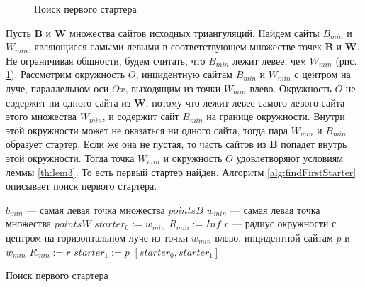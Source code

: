 \documentclass[12pt]{article}
\begin{document}
\begin{figure}[htb!]
	\caption{Поиск первого стартера}
	\label{pic:starterExample}
\end{figure}

Пусть $\textbf{B}$ и $\textbf{W}$ множества сайтов исходных триангуляций.
Найдем сайты $B_{min}$ и $W_{min}$, являющиеся самыми левыми в соответствующем множестве точек $\textbf{B}$ и $\textbf{W}$.
Не ограничивая общности, будем считать, что $B_{min}$ лежит левее, чем $W_{min}$  (рис. \ref{pic:starterExample}).
Рассмотрим окружность $O$, инцидентную сайтам $B_{min}$ и $W_{min}$ с центром на луче, параллельном оси $Ox$,
выходящим из точки $W_{min}$ влево.
Окружность $O$ не содержит ни одного сайта из $\textbf{W}$, потому что лежит левее самого левого сайта этого множества $W_{min}$,
и содержит сайт $B_{min}$ на границе окружности.
Внутри этой окружности может не оказаться ни одного сайта, тогда пара $W_{min}$ и $B_{min}$ образует стартер.
Если же она не пустая, то часть сайтов из $\textbf{B}$ попадет внутрь этой окружности.
Тогда точка $W_{min}$ и окружность $O$ удовлетворяют условиям леммы \ref{th:lem3}.
То есть первый стартер найден.
Алгоритм \ref{alg:findFirstStarter} описывает поиск первого стартера.

\begin{algorithm}[htb!]
\begin{algorithmic}[1]
	\State $b_{min}$ --- самая левая точка множества $pointsB$ 
	\State $w_{min}$ --- самая левая точка множества $pointsW$
	\State $starter_0 := w_{min}$ 
	\State $R_{min} := Inf$
		\State $r$ --- радиус окружности с центром на горизонтальном луче из точки $w_{min}$ влево,
		инцидентной сайтам $p$ и $w_{min}$
			\State $R_{min} := r$
			\State $starter_1 := p$ 
		\EndIf
	\EndFor
	\State \Return $[starter_0, starter_1]$
\EndProcedure
\end{algorithmic}
\caption{Поиск первого стартера}
\label{alg:findFirstStarter}
\end{algorithm}
\end{document}
